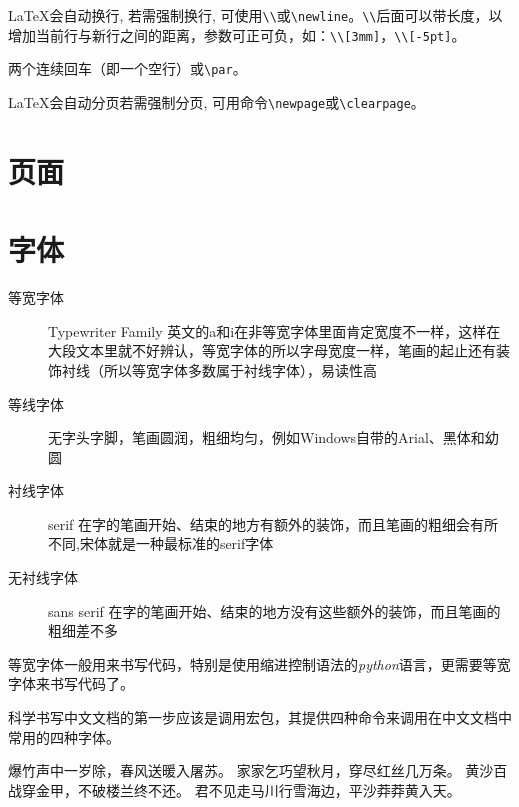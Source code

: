 \begin{description}[labelwidth=4em]
    \item[换行] \LaTeX{}会自动换行, 若需强制换行, 可使用\lstinline|\\|或\lstinline|\newline|。\lstinline|\\|后面可以带长度，以增加当前行与新行之间的距离，参数可正可负，如：\lstinline|\\[3mm]|，\lstinline|\\[-5pt]|。
    \item[分段] 两个连续回车（即一个空行）或\lstinline|\par|。
    \item[分页] \LaTeX{}会自动分页若需强制分页, 可用命令\lstinline|\newpage|或\lstinline|\clearpage|。
\end{description}



\section{页面}

\section{字体}

\begin{description}
    \item[等宽字体] Typewriter Family 英文的a和i在非等宽字体里面肯定宽度不一样，这样在大段文本里就不好辨认，等宽字体的所以字母宽度一样，笔画的起止还有装饰衬线（所以等宽字体多数属于衬线字体），易读性高
    \item[等线字体] 无字头字脚，笔画圆润，粗细均匀，例如Windows自带的Arial、黑体和幼圆
    \item[衬线字体] serif 在字的笔画开始、结束的地方有额外的装饰，而且笔画的粗细会有所不同,宋体就是一种最标准的serif字体
    \item[无衬线字体] sans serif 在字的笔画开始、结束的地方没有这些额外的装饰，而且笔画的粗细差不多
\end{description}

等宽字体一般用来书写代码，特别是使用缩进控制语法的\emph{python}语言，更需要等宽字体来书写代码了。

科学书写中文文档的第一步应该是调用\CTeX 宏包，其提供四种命令来调用在中文文档中常用的四种字体。

\begin{latex}
{\songti 爆竹声中一岁除，春风送暖入屠苏。}
{\fangsong 家家乞巧望秋月，穿尽红丝几万条。}
{\heiti 黄沙百战穿金甲，不破楼兰终不还。}
{\kaishu 君不见走马川行雪海边，平沙莽莽黄入天。}
\end{latex}

